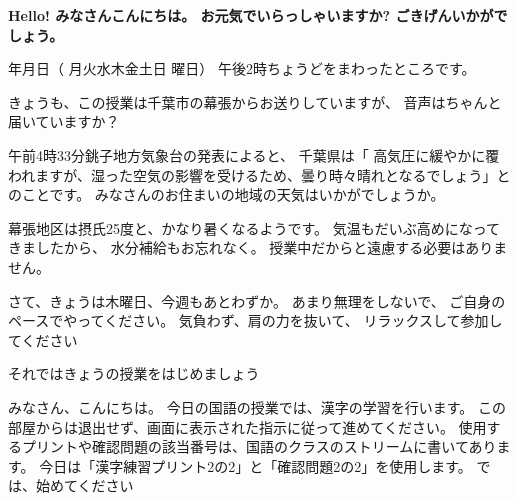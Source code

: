\documentclass[12pt,jafontscale=0.9247]{jlreq}
\makeatletter
\newcommand{\mytoday}{{\the\year}年{\the\month}月{\the\day}日}
\newcommand{\DOWjpn}{%
	\DTMcomputedayofweekindex{\@dtm@currentyear-\@dtm@currentmonth-\@dtm@currentday}{\DOWindex}%
	\ifcase\DOWindex 月\or 火\or 水\or 木\or 金\or 土\or 日\fi%
}
\makeatother
\begin{document}
\newpage
{\gtfamily\bfseries
Hello! みなさんこんにちは。
お元気でいらっしゃいますか?
ごきげんいかがでしょう。

\mytoday{}（\DOWjpn{}曜日）
午後2時ちょうどをまわったところです。

きょうも、この授業は千葉市の幕張からお送りしていますが、
音声はちゃんと届いていますか？

午前4時33分銚子地方気象台の発表によると、
千葉県は「
高気圧に緩やかに覆われますが、湿った空気の影響を受けるため、曇り時々晴れとなるでしょう」とのことです。
みなさんのお住まいの地域の天気はいかがでしょうか。

幕張地区は摂氏25度と、かなり暑くなるようです。
気温もだいぶ高めになってきましたから、
水分補給もお忘れなく。
授業中だからと遠慮する必要はありません。


さて、きょうは木曜日、今週もあとわずか。
あまり無理をしないで、
ご自身のペースでやってください。
気負わず、肩の力を抜いて、
リラックスして参加してください

それではきょうの授業をはじめましょう
}

\vfill

みなさん、こんにちは。
今日の国語の授業では、漢字の学習を行います。
この部屋からは退出せず、画面に表示された指示に従って進めてください。
使用するプリントや確認問題の該当番号は、国語のクラスのストリームに書いてあります。
今日は「漢字練習プリント2の2」と「確認問題2の2」を使用します。
では、始めてください
\end{document}
